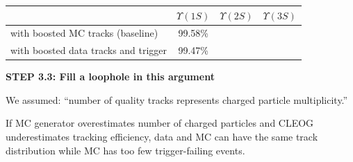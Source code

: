 \documentclass[landscape]{article}
\begin{document}
\begin{center}
  \renewcommand{\arraystretch}{1.25}
  \begin{tabular}{p{12 cm} c c c}
  & \mbox{\hspace{0.5 cm}} $\Upsilon(1S)$ \mbox{\hspace{0.5 cm}} & \mbox{\hspace{0.5 cm}} $\Upsilon(2S)$ \mbox{\hspace{0.5 cm}} & \mbox{\hspace{0.5 cm}} $\Upsilon(3S)$ \mbox{\hspace{0.5 cm}} \\\hline
  with boosted MC tracks (baseline) & 99.58\% & & \\
  with boosted data tracks and trigger & 99.47\% & & \\
  \end{tabular}
\end{center}

\vfill

\pagebreak

\vspace{1 cm}

{\bf STEP 3.3: Fill a loophole in this argument}

\vfill

We assumed: ``number of quality tracks represents charged particle
multiplicity.''

\vfill

If MC generator overestimates number of charged particles and CLEOG
underestimates tracking efficiency, data and MC can have the same track
distribution while MC has too few trigger-failing events.
\end{document}
